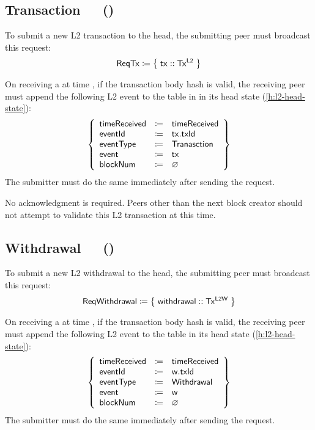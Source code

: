 \documentclass[../hydrozoa.tex]{subfiles}
\begin{document}
\subsection{Transaction~~~()}%
\label{h:l2-consensus-transaction}%

To submit a new L2 transaction to the head, the submitting peer must broadcast this request:
\begin{equation*}
  \mathsf{ReqTx} \coloneq \;\bigr\{\; \mathsf{tx} :: \mathsf{Tx^{L2}} \;\bigr\}
\end{equation*}

On receiving a  at time , if the transaction body hash is valid, the receiving peer must append the following L2 event to the  table in  in its head state (\cref{h:l2-head-state}):
\begin{equation*}
  \left\{
  \begin{array}{lll}
    \mathsf{timeReceived} &\coloneq& \mathsf{timeReceived} \\
    \mathsf{eventId} &\coloneq& \mathsf{tx.txId} \\
    \mathsf{eventType} &\coloneq& \mathsf{Tranasction} \\
    \mathsf{event} &\coloneq& \mathsf{tx} \\
    \mathsf{blockNum} &\coloneq& \varnothing
  \end{array}\right\}
\end{equation*}
The submitter must do the same immediately after sending the request.

No acknowledgment is required.
Peers other than the next block creator should not attempt to validate this L2 transaction at this time.

\subsection{Withdrawal~~~()}%
\label{h:l2-consensus-withdrawal}%

To submit a new L2 withdrawal to the head, the submitting peer must broadcast this request:
\begin{equation*}
  \mathsf{ReqWithdrawal} \coloneq \;\bigr\{\; \mathsf{withdrawal} :: \mathsf{Tx^{L2W}} \;\bigr\}
\end{equation*}

On receiving a  at time , if the transaction body hash is valid, the receiving peer must append the following L2 event to the  table in its head state (\cref{h:l2-head-state}):
\begin{equation*}
  \left\{
  \begin{array}{lll}
    \mathsf{timeReceived} &\coloneq& \mathsf{timeReceived} \\
    \mathsf{eventId} &\coloneq& \mathsf{w.txId} \\
    \mathsf{eventType} &\coloneq& \mathsf{Withdrawal} \\
    \mathsf{event} &\coloneq& \mathsf{w} \\
    \mathsf{blockNum} &\coloneq& \varnothing
  \end{array}\right\}
\end{equation*}
The submitter must do the same immediately after sending the request.
\end{document}
